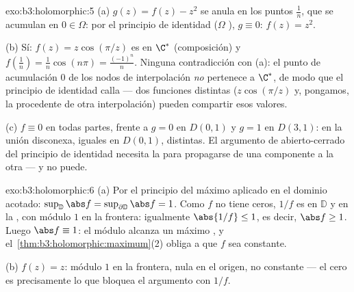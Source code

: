 \begin{solution}{exo:b3:holomorphic:5}
(a) $g(z) = f(z) - z^2$ se anula en los puntos $\frac1n$, que se
acumulan en $0 \in \Omega$: por el principio de identidad ($\Omega$
), $g \equiv 0$: $f(z) = z^2$.

(b) Sí: $f(z) = z\cos(\pi/z)$ es
 en $\C^*$ (composición) y
$f(\frac1n) = \frac1n\cos(n\pi) =
\frac{(-1)^n}n$. Ninguna contradicción con (a): el punto de acumulación
$0$ de los nodos de interpolación \emph{no} pertenece a $\C^*$, de modo
que el principio de identidad calla --- dos funciones distintas
($z\cos(\pi/z)$ y, pongamos, la procedente de otra interpolación) pueden
compartir esos valores.

(c) $f \equiv 0$ en todas partes, frente a $g = 0$ en $D(0,1)$ y $g = 1$
en $D(3,1)$:  en la unión
disconexa, iguales en $D(0,1)$, distintas. El argumento de
abierto-cerrado del principio de identidad necesita la
 para propagarse de una
componente a la otra --- y no puede.
\end{solution}

\begin{solution}{exo:b3:holomorphic:6}
(a) Por el principio del máximo aplicado en el dominio acotado:
$\sup_{\mathbb D}\abs f = \sup_{\partial\mathbb D}\abs f = 1$.
Como $f$ no tiene ceros, $1/f$ es
 en $\mathbb D$ y
 en la
, con módulo $1$ en la
frontera: igualmente $\abs{1/f} \leq 1$, es decir, $\abs f \geq 1$.
Luego $\abs f \equiv
1$: el módulo alcanza un máximo
, y
el~\cref{thm:b3:holomorphic:maximum}(2) obliga a que $f$ sea constante.

(b) $f(z) = z$: módulo $1$ en la frontera, nula en el origen, no
constante --- el cero es precisamente lo que bloquea el argumento con
$1/f$.
\end{solution}

